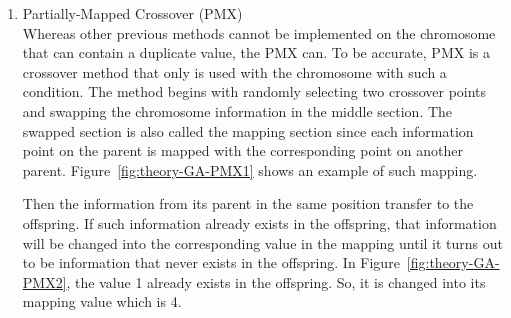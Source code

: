 \documentclass[12pt,oneside,openright,a4paper]{cpe-english-project}
\begin{document}
\begin{itemize}
\begin{enumerate}
		\begin{minipage}[c]{\textwidth}\centering
		\label{fig:theory-GA-UC}
		\end{minipage}

		\item Partially-Mapped Crossover (PMX) \\
		Whereas other previous methods cannot be implemented on the chromosome that can contain a duplicate value, the PMX can. To be accurate, PMX is a crossover method that only is used with the chromosome with such a condition. The method begins with randomly selecting two crossover points and swapping the chromosome information in the middle section. The swapped section is also called the mapping section since each information point on the parent is mapped with the corresponding point on another parent. Figure~\ref{fig:theory-GA-PMX1} shows an example of such mapping.

		\begin{minipage}[c]{\textwidth}\centering
		\label{fig:theory-GA-PMX1}
		\end{minipage}

		Then the information from its parent in the same position transfer to the offspring. If such information already exists in the offspring, that information will be changed into the corresponding value in the mapping until it turns out to be information that never exists in the offspring. In Figure~\ref{fig:theory-GA-PMX2}, the value 1 already exists in the offspring. So, it is changed into its mapping value which is 4.


\end{enumerate}
\end{itemize}
\end{document}
